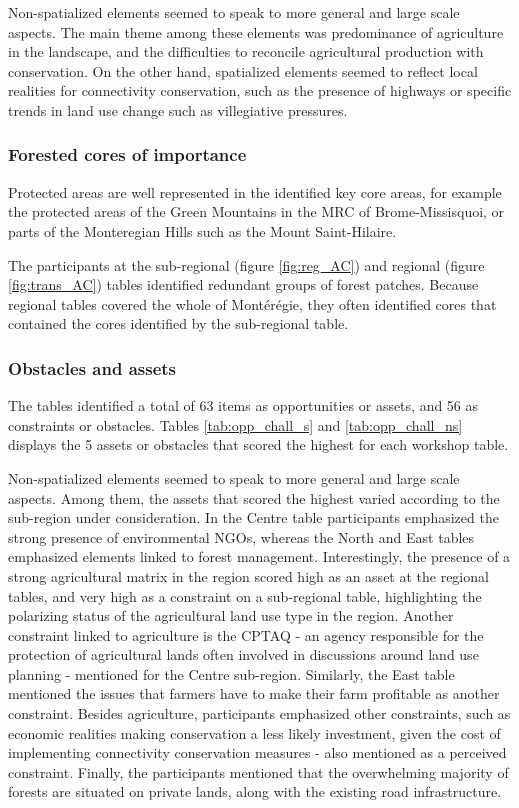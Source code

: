 Non-spatialized elements seemed to speak to more general and large scale aspects. The main theme among these elements was predominance of agriculture in the landscape, and the difficulties to reconcile agricultural production with conservation. On the other hand, spatialized elements seemed to reflect local realities for connectivity conservation, such as the presence of highways or specific trends in land use change such as villegiative pressures. \\

\subsubsection{Forested cores of importance} 

Protected areas are well represented in the identified key core areas, for example the protected areas of the Green Mountains in the MRC of Brome-Missisquoi, or parts of the Monteregian Hills such as the Mount Saint-Hilaire. 

The participants at the sub-regional (figure \ref{fig:reg_AC}) and regional (figure \ref{fig:trans_AC}) tables identified redundant groups of forest patches. Because regional tables covered the whole of Montérégie, they often identified cores that contained the cores identified by the sub-regional table. \\

\subsubsection{Obstacles and assets}

The tables identified a total of 63 items as opportunities or assets, and 56 as constraints or obstacles. Tables \ref{tab:opp_chall_s} and \ref{tab:opp_chall_ns} displays the 5 assets or obstacles that scored the highest for each workshop table. 

Non-spatialized elements seemed to speak to more general and large scale aspects. Among them, the assets that scored the highest varied according to the sub-region under consideration. In the Centre table participants emphasized the strong presence of environmental NGOs, whereas the North and East tables emphasized elements linked to forest management. Interestingly, the presence of a strong agricultural matrix in the region scored high as an asset at the regional tables, and very high as a constraint on a sub-regional table, highlighting the polarizing status of the agricultural land use type in the region. Another constraint linked to agriculture is the CPTAQ - an agency responsible for the protection of agricultural lands often involved in discussions around land use planning - mentioned for the Centre sub-region. Similarly, the East table mentioned the issues that farmers have to make their farm profitable as another constraint. Besides agriculture, participants emphasized other constraints, such as economic realities making conservation a less likely investment, given the cost of implementing connectivity conservation measures - also mentioned as a perceived constraint. Finally, the participants mentioned that the overwhelming majority of forests are situated on private lands, along with the existing road infrastructure.

